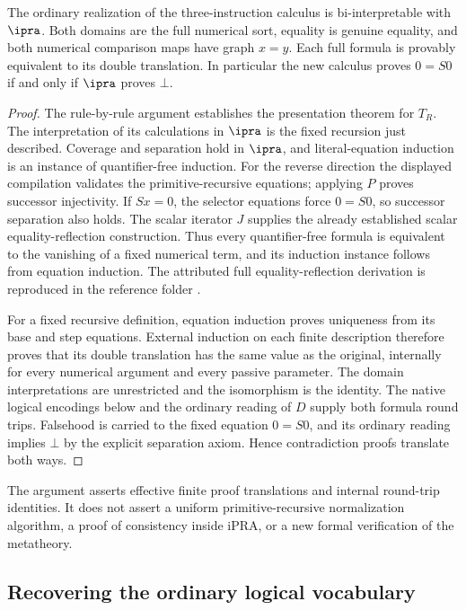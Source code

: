 \begin{theorem}
The ordinary realization of the three-instruction calculus is
bi-interpretable with $\ipra$. Both domains are the full numerical sort,
equality is genuine equality, and both numerical comparison maps have
graph $x=y$. Each full formula is provably equivalent to its double
translation. In particular the new calculus proves $0=S0$ if and only
if $\ipra$ proves $\bot$.
\end{theorem}
\begin{proof}
The rule-by-rule argument establishes the presentation theorem for
$T_R$. The interpretation of its calculations in $\ipra$ is the fixed
recursion just described. Coverage and separation hold in $\ipra$, and
literal-equation induction is an instance of quantifier-free induction.
For the reverse direction the displayed compilation validates the
primitive-recursive equations; applying $P$ proves successor injectivity.
If $Sx=0$, the selector equations force $0=S0$, so successor separation
also holds. The scalar iterator $J$ supplies the already established
scalar equality-reflection construction. Thus every quantifier-free
formula is equivalent to the vanishing of a fixed numerical term, and
its induction instance follows from equation induction. The attributed
full equality-reflection derivation is reproduced in the reference folder
\cite{foundations}.

For a fixed recursive definition, equation induction proves uniqueness
from its base and step equations. External induction on each finite
description therefore proves that its double translation has the same
value as the original, internally for every numerical argument and every
passive parameter. The domain interpretations are unrestricted and the
isomorphism is the identity. The native logical encodings below and the
ordinary reading of $D$ supply both formula round trips. Falsehood is
carried to the fixed equation $0=S0$, and its ordinary reading implies
$\bot$ by the explicit separation axiom. Hence contradiction proofs
translate both ways.
\end{proof}

The argument asserts effective finite proof translations and internal
round-trip identities. It does not assert a uniform primitive-recursive
normalization algorithm, a proof of consistency inside iPRA, or a new
formal verification of the metatheory.

\subsection{Recovering the ordinary logical vocabulary}

